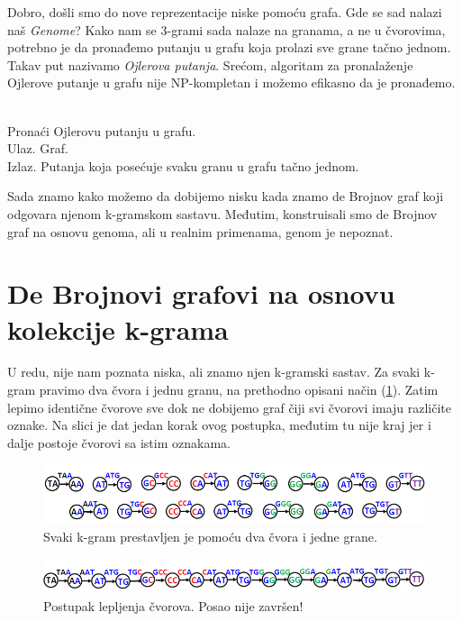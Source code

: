 Dobro, došli smo do nove reprezentacije niske pomoću grafa. Gde se sad nalazi naš \textit{Genome}? Kako nam se 3-grami sada nalaze na granama, a ne u čvorovima, potrebno je da pronađemo putanju u grafu koja prolazi sve grane tačno jednom. Takav put nazivamo \textit{Ojlerova putanja}. Srećom, algoritam za pronalaženje Ojlerove putanje u grafu nije NP-kompletan i možemo efikasno da je pronađemo.


\begin{problem}
	~\\ Pronaći Ojlerovu putanju u grafu.
	\\ Ulaz. Graf.
	\\ Izlaz. Putanja koja posećuje svaku granu u grafu tačno jednom.
\end{problem}


Sada znamo kako možemo da dobijemo nisku kada znamo de Brojnov graf koji odgovara njenom k-gramskom sastavu. Međutim, konstruisali smo de Brojnov graf na osnovu genoma, ali u realnim primenama, genom je nepoznat.


\section{De Brojnovi grafovi na osnovu kolekcije k-grama}

U redu, nije nam poznata niska, ali znamo njen k-gramski sastav. Za svaki k-gram pravimo dva čvora i jednu granu, na prethodno opisani način (\ref{slika:kgrami}).
Zatim lepimo identične čvorove sve dok ne dobijemo graf čiji svi čvorovi imaju različite oznake. Na slici je dat jedan korak ovog postupka, međutim tu nije kraj jer i dalje postoje čvorovi sa istim oznakama.

\begin{figure}[h]
	\centering
	\includegraphics[width=1\textwidth]{poglavlja/3/slike/debrojnov1.png}
	\caption{Svaki k-gram prestavljen je pomoću dva čvora i jedne grane.}
	\label{slika:kgrami}
\end{figure} 

\begin{figure}[h]
	\centering
	\includegraphics[width=1\textwidth]{poglavlja/3/slike/lepljenje.png}
	\caption{Postupak lepljenja čvorova. Posao nije završen!}
	\label{slika:lepljenje}
\end{figure} 



